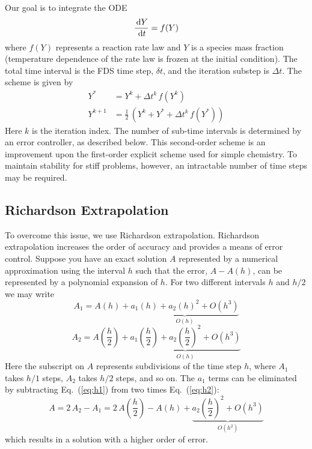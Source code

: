 Our goal is to integrate the ODE
\begin{equation}
\frac{\,\mathrm{d} Y}{\,\mathrm{d} t} = f(Y)
\end{equation}
where $f(Y)$ represents a reaction rate law and $Y$ is a species mass fraction (temperature dependence of the rate law is frozen at the initial condition).  The total time interval is the FDS time step, $\delta t$, and the iteration substep is $\Delta t$. The scheme is given by
\begin{align}
\label{RK2-1} Y^* &= Y^k + \Delta t^k \, f(Y^k) \\
\label{RK2-2} Y^{k+1}   &= \frac{1}{2}\,(Y^k + Y^* + \Delta t^k \, f(Y^*))
\end{align}
Here $k$ is the iteration index.  The number of sub-time intervals is determined by an error controller, as described below. This second-order scheme is an improvement upon the first-order explicit scheme used for simple chemistry. To maintain stability for stiff problems, however, an intractable number of time steps may be required.

\subsection*{Richardson Extrapolation}

To overcome this issue, we use Richardson extrapolation. Richardson extrapolation increases the order of accuracy and provides a means of error control. Suppose you have an exact solution $A$ represented by a numerical approximation using the interval $h$ such that the error, $A-A(h)$, can be represented by a polynomial expansion of $h$. For
two different intervals $h$ and $h/2$ we may write
\begin{equation}\label{eq:h1}
A_1={A(h)} + \underbrace{a_{1}(h) + a_{2}(h)^2 + \mathit{O}(h^3)}_{\mathit{O}(h)}
\end{equation}
\begin{equation}\label{eq:h2}
A_2=A\left(\frac{h}{2}\right) + \underbrace{a_{1}\left(\frac{h}{2}\right) + a_{2}\left(\frac{h}{2}\right)^2 + \mathit{O}(h^3)}_{\mathit{O}(h)}
\end{equation}
Here the subscript on $A$ represents subdivisions of the time step $h$, where $A_1$ takes $h/1$ steps, $A_2$ takes $h/2$ steps, and so on. The $a_{1}$ terms can be eliminated by subtracting Eq.~(\ref{eq:h1}) from two times Eq.~(\ref{eq:h2}):
\begin{equation}\label{eq:A2}
A=2\,A_2-A_1 = 2\,A\left(\frac{h}{2}\right) - A(h) + \underbrace{a_{2}\left(\frac{h}{2}\right)^2 + \mathit{O}(h^3)}_{\mathit{O}(h^2)}
\end{equation}
which results in a solution with a higher order of error.

